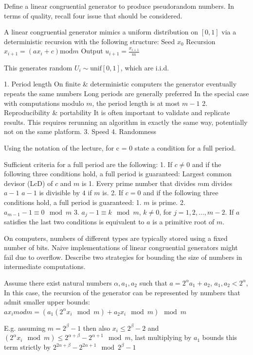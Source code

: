 Define a linear congruential generator to produce pseudorandom numbers. In terms
of quality, recall four issue that should be considered.

A linear congruential generator mimics a uniform distribution on \( [0, 1] \) via a deterministic recursion with the
following structure:
Seed \( x_0 \)
Recursion \( x_{i+1} = (a x_{i} + c) \text{mod} m \) 
Output \( u_{i+1} = \frac{x_{i+1}}{m}\)

This generates random \( U_i \sim \text{unif}[0, 1] \), which are i.i.d.

1. Period length
On finite & deterministic computers the generator eventually repeats the same numbers
Long periods are generally preferred
In the special case with computations modulo \( m \), the period length is at most \( m − 1 \)
2. Reproducibility & portability
It is often important to validate and replicate results. This requires rerunning an algorithm in exactly the same
way, potentially not on the same platform.
3. Speed
4. Randomness

Using the notation of the lecture, for c = 0 state a condition for a full period.

Sufficient criteria for a full period are the following:
1. If \( c \neq 0 \) and if the following three conditions hold, a full period is guaranteed:
Largest common devisor (LcD) of \( c \) and \( m \) is 1.
Every prime number that divides \( m \)m divides \( a - 1 \)
\( a − 1 \) is divisible by \( 4 \) if \( m \) is.
2.
If \( c = 0 \) and if the following three conditions hold, a full period is guaranteed:
1. \( m \) is prime.
2. \( a_{m-1} - 1 \equiv 0 \mod m \)
3. \( a_{j} - 1 \equiv k \mod m \), \( k \neq 0 \), for \( j = 1, 2, \dots, m − 2. \)
If \( a \) satisfies the last two conditions is equivalent to \( a \) is a primitive root of \( m \).

On computers, numbers of different types are typically stored using a fixed number
of bits. Naive implementations of linear congruential generators might fail due to
overflow. Describe two strategies for bounding the size of numbers in intermediate
computations.

Assume there exist natural numbers \( \alpha, a_1, a_2 \) such that
\( a = 2^\alpha a_1 + a_2 \),
\( a_1 , a_2 < 2^\alpha\),
In this case, the recursion of the generator can be represented by numbers that admit smaller upper bounds:
\( ax_i mod m = (a_1 (2^{\alpha} x_i \mod m) + a_2 x_i \mod m) \mod m \)

E.g. assuming \( m = 2^{\beta} - 1 \) then also \( x_i \leq 2^{\beta} - 2 \) and \( (2^{\alpha} x_i \mod m) \leq 2^{\alpha + \beta} - 2^{\alpha + 1} \mod m \),
last multiplying by \( a_1 \) bounds this term strictly by  \( 2^{2 \alpha + \beta} - 2^{2 \alpha + 1} \mod 2^{ \beta } - 1 \)

